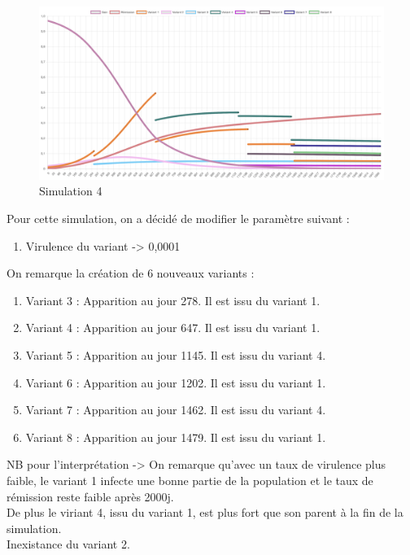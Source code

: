 \documentclass{article}
\begin{document}
\begin{figure}[h]
    \includegraphics[width=\linewidth]{images/Simulation4.png}
    \caption{Simulation 4}
    \label{fig:simulation4}
\end{figure}

Pour cette simulation, on a décidé de modifier le paramètre suivant : 
\begin{enumerate}
    \item Virulence du variant -> 0,0001 \\
\end{enumerate}
\noindent
On remarque la création de 6 nouveaux variants : \\
\begin{enumerate}
    \item Variant 3 : Apparition au jour 278. Il est issu du variant 1. 
    \item Variant 4 : Apparition au jour 647. Il est issu du variant 1.
    \item Variant 5 : Apparition au jour 1145. Il est issu du variant 4.
    \item Variant 6 : Apparition au jour 1202. Il est issu du variant 1. 
    \item Variant 7 : Apparition au jour 1462. Il est issu du variant 4.
    \item Variant 8 : Apparition au jour 1479. Il est issu du variant 1. \\
\end{enumerate}

NB pour l'interprétation -> On remarque qu'avec un taux de virulence plus faible, le variant 1 infecte une bonne partie de la population et le taux de rémission reste faible après 2000j. \\
De plus le viriant 4, issu du variant 1, est plus fort que son parent à la fin de la simulation. \\
Inexistance du variant 2.
\end{document}
